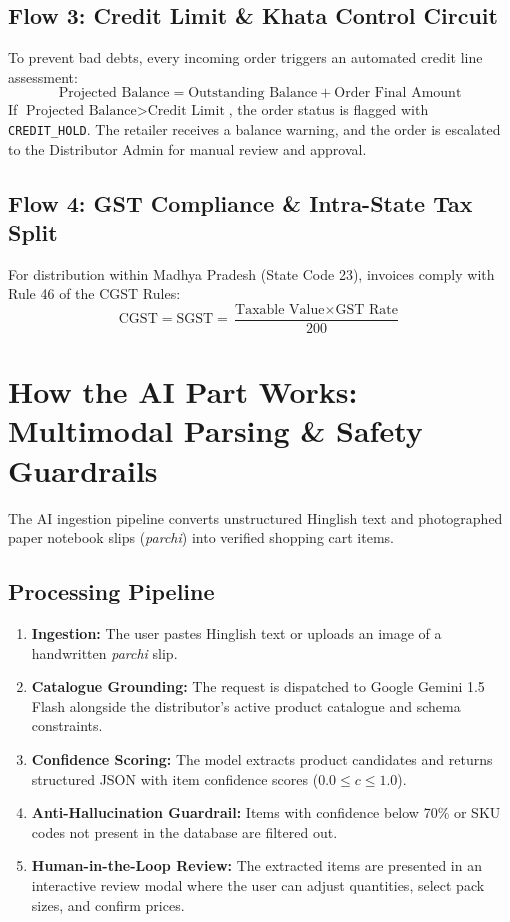 \documentclass[11pt,a4paper]{article}
\begin{document}
\subsection{Flow 3: Credit Limit \& Khata Control Circuit}
To prevent bad debts, every incoming order triggers an automated credit line assessment:
\begin{equation}
    \text{Projected Balance} = \text{Outstanding Balance} + \text{Order Final Amount}
\end{equation}
If $\text{Projected Balance} > \text{Credit Limit}$, the order status is flagged with \texttt{CREDIT\_HOLD}. The retailer receives a balance warning, and the order is escalated to the Distributor Admin for manual review and approval.

\subsection{Flow 4: GST Compliance \& Intra-State Tax Split}
For distribution within Madhya Pradesh (State Code 23), invoices comply with Rule 46 of the CGST Rules:
\begin{equation}
    \text{CGST} = \text{SGST} = \frac{\text{Taxable Value} \times \text{GST Rate}}{200}
\end{equation}

\section{How the AI Part Works: Multimodal Parsing \& Safety Guardrails}

The AI ingestion pipeline converts unstructured Hinglish text and photographed paper notebook slips (\textit{parchi}) into verified shopping cart items.

\subsection{Processing Pipeline}
\begin{enumerate}[leftmargin=1.5cm]
    \item \textbf{Ingestion:} The user pastes Hinglish text or uploads an image of a handwritten \textit{parchi} slip.
    \item \textbf{Catalogue Grounding:} The request is dispatched to Google Gemini 1.5 Flash alongside the distributor's active product catalogue and schema constraints.
    \item \textbf{Confidence Scoring:} The model extracts product candidates and returns structured JSON with item confidence scores ($0.0 \le c \le 1.0$).
    \item \textbf{Anti-Hallucination Guardrail:} Items with confidence below 70\% or SKU codes not present in the database are filtered out.
    \item \textbf{Human-in-the-Loop Review:} The extracted items are presented in an interactive review modal where the user can adjust quantities, select pack sizes, and confirm prices.
\end{enumerate}
\end{document}
